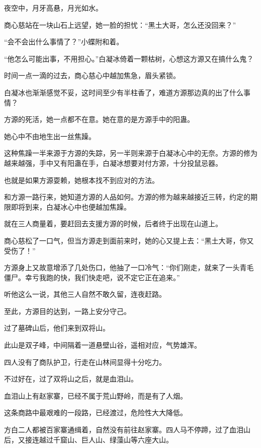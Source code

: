
\begin{this_body}

夜空中，月牙高悬，月光如水。

商心慈站在一块山石上远望，她一脸的担忧：“黑土大哥，怎么还没回来？”

“会不会出什么事情了？”小蝶附和着。

“他怎么可能出事，不用担心。”白凝冰倚着一颗枯树，心想这方源又在搞什么鬼？

时间一点一滴的过去，商心慈心中越加焦急，眉头紧锁。

白凝冰也渐渐感觉不妥，这时间至少有半柱香了，难道方源那边真的出了什么事情？

方源的死活，她一点都不在意。她在意的是方源手中的阳蛊。

她心中不由地生出一丝焦躁。

这种焦躁一半来源于方源的失踪，另一半则来源于白凝冰心中的无奈。方源的修为越来越强，手中又有阳蛊在手，白凝冰想要对付方源，十分投鼠忌器。

也就是如果方源耍赖，她根本找不到应对的方法。

和方源一路行来，她知道方源的人品如何。方源的修为越来越接近三转，约定的期限即将到来，白凝冰心中也便越加焦躁。

就在三人商量着，要赶回去支援方源的时候，后者终于出现在山道上。

商心慈松了一口气，但当方源走到面前来时，她的心又提上去：“黑土大哥，你又受伤了！”

方源身上又故意增添了几处伤口，他抽了一口冷气：“你们刚走，就来了一头青毛僵尸。幸亏我跑的快，我们快走吧，说不定它正在追来。”

听他这么一说，其他三人自然不敢久留，连夜赶路。

至此，方源目的达到，一路上安分守己。

过了墓碑山后，他们来到双将山。

此山是双子峰，中间隔着一道悬壁山谷，遥相对应，气势雄浑。

四人没有了商队护卫，行走在山林间显得十分吃力。

不过好在，过了双将山之后，就是血泪山。

血泪山上有赵家寨，已经不属于荒山野岭，而是有了人烟。

这条商路中最艰难的一段路，已经渡过，危险性大大降低。

方白二人都被百家寨通缉着，自然没有前往赵家寨。四人马不停蹄，过了血泪山后，又接连越过千窟山、巨人山、绿藻山等六座大山。


\end{this_body}
